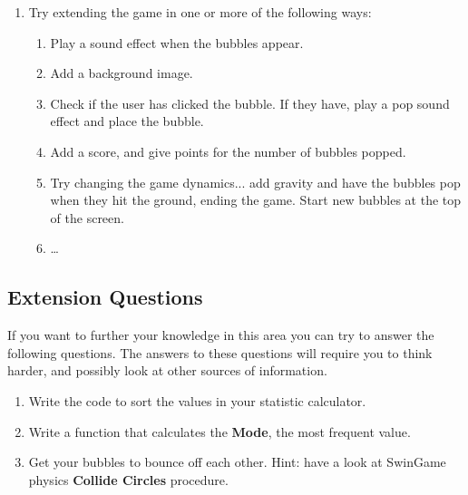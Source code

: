 \begin{enumerate}
  \item Try extending the game in one or more of the following ways:
  
 \begin{enumerate}
  \item Play a sound effect when the bubbles appear.
  \item Add a background image.
  \item Check if the user has clicked the bubble. If they have, play a pop sound effect and place the bubble.
  \item Add a score, and give points for the number of bubbles popped.
  \item Try changing the game dynamics... add gravity and have the bubbles pop when they hit the ground, ending the game. Start new bubbles at the top of the screen.
  \item \ldots
 \end{enumerate}
  
\end{enumerate}

\clearpage
\subsection{Extension Questions} %
\label{sub:extension_questions_array}

If you want to further your knowledge in this area you can try to answer the following questions. The answers to these questions will require you to think harder, and possibly look at other sources of information.
\begin{enumerate}
  \item Write the code to sort the values in your statistic calculator.
  \item Write a function that calculates the \textbf{Mode}, the most frequent value.
  \item Get your bubbles to bounce off each other. Hint: have a look at SwinGame physics \textbf{Collide Circles} procedure.

  
  
  
\end{enumerate}